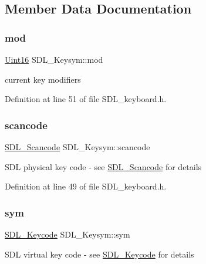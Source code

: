 \subsection{Member Data Documentation}
\mbox{\label{struct_s_d_l___keysym_ab519d1b8a9939d3d035f7103f3208291}} 
\subsubsection{\texorpdfstring{mod}{mod}}
{\footnotesize\ttfamily \mbox{\hyperlink{_s_d_l__stdinc_8h_a31fcc0a076c9068668173ee26d33e42b}{Uint16}} S\+D\+L\+\_\+\+Keysym\+::mod}

current key modifiers 

Definition at line 51 of file S\+D\+L\+\_\+keyboard.\+h.

\mbox{\label{struct_s_d_l___keysym_ad47e9120a511e2efc7ec0c6d8a5ec51e}} 
\subsubsection{\texorpdfstring{scancode}{scancode}}
{\footnotesize\ttfamily \mbox{\hyperlink{_s_d_l__scancode_8h_a82ab7cff701034fb40a47b5b3a02777b}{S\+D\+L\+\_\+\+Scancode}} S\+D\+L\+\_\+\+Keysym\+::scancode}

S\+DL physical key code -\/ see \mbox{\hyperlink{_s_d_l__scancode_8h_a82ab7cff701034fb40a47b5b3a02777b}{S\+D\+L\+\_\+\+Scancode}} for details 

Definition at line 49 of file S\+D\+L\+\_\+keyboard.\+h.

\mbox{\label{struct_s_d_l___keysym_a082ff1fd787b79fa6c3a445deb225f08}} 
\subsubsection{\texorpdfstring{sym}{sym}}
{\footnotesize\ttfamily \mbox{\hyperlink{_s_d_l__keycode_8h_ae9265f064f13f0f74dfca26a67875171}{S\+D\+L\+\_\+\+Keycode}} S\+D\+L\+\_\+\+Keysym\+::sym}

S\+DL virtual key code -\/ see \mbox{\hyperlink{_s_d_l__keycode_8h_ae9265f064f13f0f74dfca26a67875171}{S\+D\+L\+\_\+\+Keycode}} for details 

